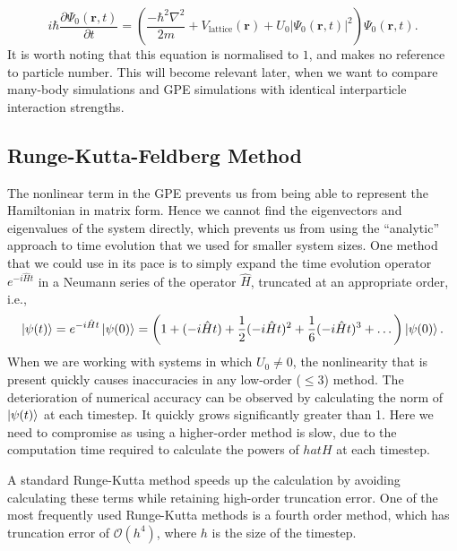 \documentclass[a4paper, 10pt]{article}
\theoremstyle{plain}
\begin{document}
\begin{equation}
 i\hbar \frac{\partial\Psi_{0}(\mathbf{r},t)}{\partial t}
 = 
 \left( 
 \frac{-\hbar^2\nabla^2}{2m}
 +
 V_{\text{lattice}}(\mathbf{r})
 +
 U_0 |\Psi_{0}(\mathbf{r},t)|^2 
 \right)
 \Psi_{0}(\mathbf{r},t)   .
\end{equation}
It is worth noting that this equation is normalised to $1$, and makes no 
reference to particle number. This will become relevant later, when we want
to compare many-body simulations and GPE simulations with identical 
interparticle interaction strengths. 
\subsection{Runge-Kutta-Feldberg Method}

The nonlinear term in the GPE prevents us from being able to represent the
Hamiltonian in matrix form. Hence we cannot find the eigenvectors and
eigenvalues of the system directly, which prevents us from using the ``analytic''
approach to time evolution that we used for smaller system sizes. One method
that we could use in its pace is to simply expand the time evolution operator
$e^{-i \hat{H} t}$ in a Neumann series of the operator $\hat{H}$, truncated at
an appropriate order, i.e.,
\begin{equation}
    \ket{\psi(t)}
    =
    e^{-i\hat{H}t}\ket{\psi(0)}
    =
    \left (
        1 + (-i \hat{H} t) + \frac{1}{2}(-i \hat{H} t)^{2} +
        \frac{1}{6}(-i \hat{H} t)^{3} + \dots
    \right)
    \ket{\psi(0)}.
\end{equation}
When we are working with systems in which $U_{0} \neq 0$, the nonlinearity that
is present quickly causes inaccuracies in any low-order ($\leq3$) method.
The deterioration of numerical accuracy can be observed by calculating the norm
of $\ket{\psi(t)}$ at each timestep. It quickly grows significantly greater than
1. Here we need to compromise as using a higher-order method is slow, due to the
computation time required to calculate the powers of $hat{H}$ at
each timestep.

A standard Runge-Kutta method speeds up the calculation by avoiding calculating
these terms while retaining high-order truncation error. One of the most
frequently used Runge-Kutta methods is a fourth order method, which has
truncation error of $\mathcal{O}(h^4)$, where $h$ is the size of the timestep.
\end{document}
